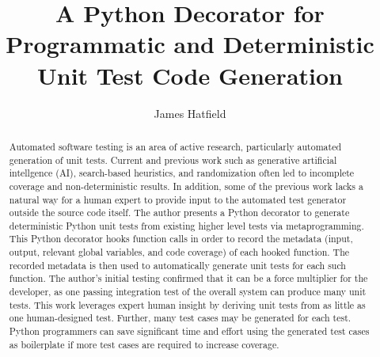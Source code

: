 \documentclass[%
  anonymous=true,%
  authordraft=true,%
  format=sigconf,%
  review=false,%
  screen=true,%
  timestamp=false,%
  pbalance,%
]{acmart}
\begin{document}

\title{A Python Decorator for Programmatic and Deterministic Unit Test Code Generation}

\author{James Hatfield}


  

\begin{abstract}
  Automated software testing is an area of active research, 
  particularly automated generation of unit tests. 
  Current and previous work such as generative artificial intellgence (AI), search-based heuristics, and 
  randomization often led to incomplete coverage and non-deterministic results.
  In addition, some of the previous work lacks a natural way for a human expert 
  to provide input to the automated test generator outside the source code itself. 
  The author presents a Python decorator to generate deterministic Python 
  unit tests from existing higher level tests via metaprogramming.  
  This Python decorator hooks function calls in order to record the 
  metadata (input, output, relevant global variables, and code coverage) 
  of each hooked function. 
  The recorded metadata is then used to automatically generate unit 
  tests for each such function.
  The author's initial testing confirmed that it can 
  be a force multiplier for the developer, 
  as one passing integration test of the overall 
  system can produce many unit tests.  
  This work leverages expert human insight by deriving unit tests
  from as little as one human-designed test.
  Further, many test cases may be generated for each test.  
  Python programmers can save significant time and effort using the 
  generated test cases as boilerplate if more test cases are required to 
  increase coverage.  

\end{abstract}

\end{document}
